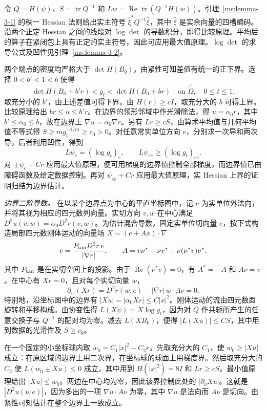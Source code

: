 令 $Q=H(\psi)$、$S=\operatorname{tr}Q^{-1}$ 和 $Lw=\operatorname{Re}\operatorname{tr}(Q^{-1}H(w))$。引理~\ref{ms:lemma-3-1} 的秩一 Hessian 法则给出实主符号 $\widehat\xi^*Q^{-1}\widehat\xi$，其中 $\widehat\xi$ 是实余向量的四槽编码。沿两个正定 Hessian 之间的线段对 $\log\det$ 的导数积分，即得比较原理。平均后的算子在紧闭包上具有正定的实主符号，因此可应用最大值原理。$\log\det$ 的求导公式及凹性见引理~\ref{ms:lemma-3-2}。

两个端点的密度均严格大于 $\det H(B_0)$，由紧性可知差值有统一的正下界。选择 $0<b'<1<b$ 使得
\[
 \det H(B_0+b'r)<g_t<\det H(B_0+br)
 \quad\text{on }\overline{\widetilde\Omega},\quad 0\le t\le1.
\]
取充分小的 $b'$，由上述差值可得下界。由 $H(r)\ge cI$，取充分大的 $b$ 可得上界。比较原理给出 $br\le u\le b'r$。在边界的领形邻域中作光滑除法，得 $u=\alpha_0r$，其中 $b'\le\alpha_0\le b$，故在边界上 $\nabla u=\alpha_0\nabla r$。另有 $Lr\ge cS$，由算术平均值与几何平均值不等式得 $S\ge mg_t^{-1/m}\ge c_0>0$。对任意常实单位方向 $e$，分别求一次导和两次导，后者利用凹性，得到
\[
 L\psi_e=(\log g_t)_e,\qquad L\psi_{ee}\ge(\log g_t)_{ee}.
\]
对 $\pm\psi_e+Cr$ 应用最大值原理，便可用梯度的边界值控制全部梯度，而边界值已由障碍函数及给定数据控制。再对 $\psi_{ee}+Cr$ 应用最大值原理，实 Hessian 上界的证明归结为边界估计。

\emph{边界二阶导数。} 在以某个边界点为中心的平直坐标图中，记 $\nu$ 为实单位外法向，并将其视为相应的四元数列向量。实切方向 $v,w$ 在中心满足 $D^2u(v,w)=\alpha_0D^2r(v,w)$。为估计混合导数，固定实单位切向量 $e$，按下式构造局部四元数刚体运动的向量场 $X=(e+Ax)\cdot\nabla$
\[
 v=\frac{P_{\rm tan}D^2r\,e}{|\nabla r|},\qquad
 A=v\nu^*-\nu v^*-\nu(\nu^*v)\nu^* .
\]
其中 $P_{\rm tan}$ 是在实切空间上的投影。由于 $\operatorname{Re}(\nu^*v)=0$，有 $A^*=-A$ 和 $A\nu=v$。在中心有 $Xr=0$，且对每个实切向量 $w$，
\[
 \partial_w(Xr)=D^2r(w,e)-|\nabla r|\,w\cdot A\nu=0.
\]
特别地，沿坐标图中的边界有 $|Xu|=|\alpha_0Xr|\le C|x|^2$。刚体运动的流由四元数酉旋转和平移构成。由协变性得 $L(X\psi)=X\log g_t$，因为对 $Q$ 作共轭所产生的任意交换子与 $Q^{-1}$ 的配对均为零。减去 $L(XB_0)$，便得 $|L(Xu)|\le CS$，其中用到数据的光滑性及 $S\ge c_0$。

在一个固定的小坐标球内取 $w_0=C_1|x|^2-C_2r$。先取充分大的 $C_1$，使 $w_0\ge|Xu|$ 成立：在原区域的边界上用二次界，在坐标球的球面上用梯度界。然后取充分大的 $C_2$ 使 $L(w_0\pm Xu)\le0$ 成立，其中用到 $H(|x|^2)=8I$ 和 $Lr\ge cS$。最小值原理给出 $|Xu|\le w_0$。两边在中心均为零，因此该界控制此处的 $|\partial_\nu Xu|$。这就是 $|D^2u(\nu,e)|$，因为多出的一项 $\nabla u\cdot A\nu$ 为零，其中 $\nabla u$ 是法向而 $A\nu$ 是切向。由紧性可知估计在整个边界上一致成立。

